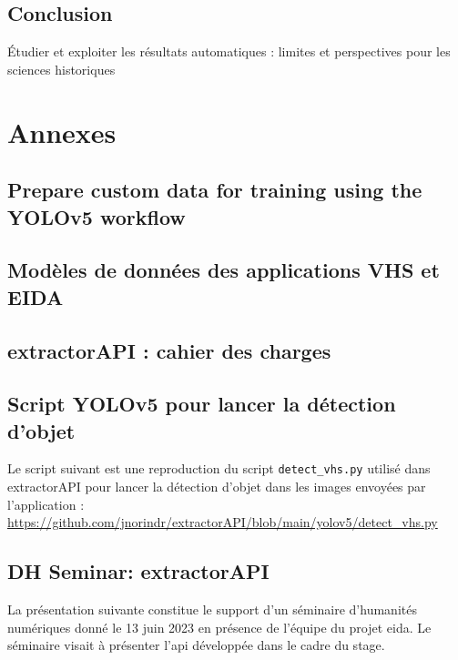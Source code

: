 \documentclass[a4paper,12pt,twoside]{book}
\newcommand{\api}{\gls{api}\xspace}
\newcommand{\eida}{\gls{eida}\xspace}
\newcommand{\exapi}{extractorAPI\xspace}
\newcommand{\clearemptydoublepage}{\newpage{\pagestyle{empty}\cleardoublepage}}
\newcommand\chapterNo[1]{
  \chapter*{#1}
  \markright{\MakeUppercase{#1}}
}
\begin{document}
    \chapterNo{Conclusion}
    Étudier et exploiter les résultats automatiques : limites et perspectives pour les sciences historiques
    \clearemptydoublepage
    
\appendix
    \part*{Annexes}	
    
    \chapter[Prepare custom data for training]{\label{YOLOv5Training}Prepare custom data for training using the YOLOv5 workflow}
	    
	    \clearemptydoublepage
    \chapter[Modèles de données EIDA/VHS]{\label{eidaDataModels}Modèles de données des applications VHS et EIDA}
	    
     	\clearemptydoublepage
    \chapter{\label{exapiCahier}extractorAPI : cahier des charges}
	    
	    \clearemptydoublepage
	\chapter{\label{yoloScript}Script YOLOv5 pour lancer la détection d'objet}
		Le script suivant est une reproduction du script \texttt{detect\_vhs.py} utilisé dans \exapi pour lancer la détection d'objet dans les images envoyées par l'application : \url{https://github.com/jnorindr/extractorAPI/blob/main/yolov5/detect_vhs.py}
		
	    \clearemptydoublepage
	\chapter{\label{DHSeminar}DH Seminar: extractorAPI}
		La présentation suivante constitue le support d'un séminaire d'humanités numériques donné le 13 juin 2023 en présence de l'équipe du projet \eida. Le séminaire visait à présenter l'\api développée dans le cadre du stage.
		
	    \clearemptydoublepage
\end{document}
